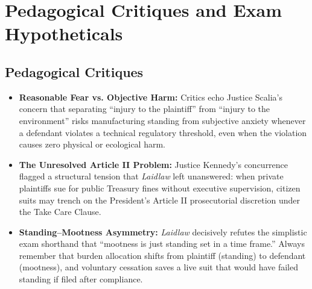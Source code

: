 \documentclass[12pt]{article}
\begin{document}
\section{Pedagogical Critiques and Exam Hypotheticals}
\subsection{Pedagogical Critiques}
\begin{itemize}
  \item \textbf{Reasonable Fear vs. Objective Harm:} Critics echo Justice Scalia's concern that separating ``injury to the plaintiff'' from ``injury to the environment'' risks manufacturing standing from subjective anxiety whenever a defendant violates a technical regulatory threshold, even when the violation causes zero physical or ecological harm.
  \item \textbf{The Unresolved Article II Problem:} Justice Kennedy's concurrence flagged a structural tension that \textit{Laidlaw} left unanswered: when private plaintiffs sue for public Treasury fines without executive supervision, citizen suits may trench on the President's Article II prosecutorial discretion under the Take Care Clause.
  \item \textbf{Standing--Mootness Asymmetry:} \textit{Laidlaw} decisively refutes the simplistic exam shorthand that ``mootness is just standing set in a time frame.'' Always remember that burden allocation shifts from plaintiff (standing) to defendant (mootness), and voluntary cessation saves a live suit that would have failed standing if filed after compliance.
\end{itemize}
\end{document}
